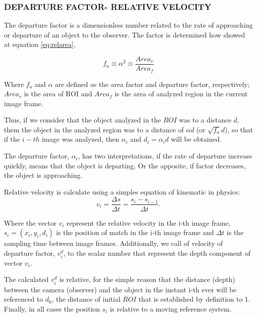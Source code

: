 
\subsubsection{DEPARTURE FACTOR- RELATIVE VELOCITY}
The departure factor is a dimensionless number related to the rate of approaching 
or departure of an object to the observer. The factor
is determined how showed at equation \ref{eq:relarea},

\begin{equation}\label{eq:relarea}
f_a \equiv \alpha^2 \equiv \frac{Area_r}{Area_f} 
\end{equation}

Where $f_a$ and $\alpha$ are defined as the area factor and departure factor, 
respectively; $Area_r$ is the area of ROI and $Area_f$ 
is the area of analyzed region in the current image frame. 

Thus, if we consider that the object analyzed in the $ROI$ was to a distance $d$,
them the object in the analyzed region was to a distance of $\alpha d$ (or $\sqrt{f_a} d$),
so that if the $i-th$ image was analyzed, then $\alpha_i$ and $d_i=\alpha_i d$ will be obtained.

The departure factor, $\alpha_i$, has two interpretations, if the rate of departure increase quickly, 
means that the object is departing. Or the apposite, if factor decreases, the 
object is approaching.

Relative velocity is calculate using a simples equation of kinematic in physics:
\begin{equation}
 v_i = \frac{\Delta s}{\Delta t}= \frac{s_i-s_{i-1}}{\Delta t}.
\end{equation}

Where the vector $v_i$ represent the relative velocity in the i-th image frame, 
$s_i=(x_i,y_i,d_i)$ is the position of match in the i-th image frame
and $\Delta t$ is the sampling time between image frames.
Additionally, we call of velocity of departure factor, $v^d_i$, 
to the scalar number that represent the depth component
of vector $v_i$.

The calculated  $v^d_i$  is relative, for the simple reason that the distance (depth) between the 
camera (observer) and the object in the instant i-th ever will be referenced to $d_0$, the distance of
initial $ROI$ that is established by definition to 1.
Finally, in all cases the position $s_i$ is relative to a moving reference system.

